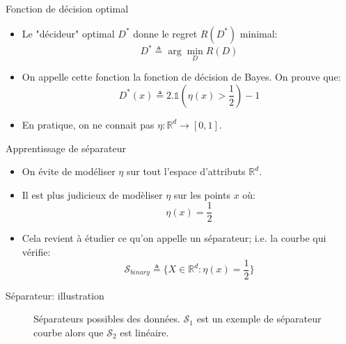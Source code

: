\documentclass[8pt]{beamer}
\begin{document}
		\begin{frame}{Fonction de décision optimal}
			\begin{itemize}
				\item<1-> Le "décideur" optimal $D^*$ donne le regret $R(D^*)$ minimal:
					  \begin{equation}
						  D^* \triangleq \arg \min_{D} R(D) 
					  \end{equation}
				\item<2-> On appelle cette fonction la fonction de décision de Bayes. On prouve que:
					  \begin{equation}
						D^*(x) \triangleq 2.\mathbb{1}(\eta(x) > \frac{1}{2}) - 1
					  \end{equation}
				\item<3-> En pratique, on ne connait pas $\eta: \mathbb{R}^d \rightarrow [0,1]$.
			\end{itemize}
		\end{frame}

		\begin{frame}{Apprentissage de séparateur}
			\begin{itemize}
				\item<1-> On évite de modéliser $\eta$ sur tout l'espace d'attributs $\mathbb{R}^d$.
				\item<2-> Il est plus judicieux de modèliser $\eta$ sur les points $x$ où:
						\begin{equation*}
							\eta(x) = \frac{1}{2}
						\end{equation*}
				\item<3->  Cela revient à étudier ce qu'on appelle un séparateur; i.e. la courbe qui vérifie:
					\begin{equation}
						\mathscr{S}_{binary} \triangleq \{X \in \mathbb{R}^d: \eta(x) = \frac{1}{2} \}
					\end{equation}
			\end{itemize}
		\end{frame}

		\begin{frame}{Séparateur: illustration}
			\begin{figure}[H]
				
				\caption*{\tiny Séparateurs possibles des données. $\mathscr{S}_1$ est un exemple de séparateur courbe alors que $\mathscr{S}_2$ est linéaire.}
			\end{figure}
		\end{frame}
\end{document}
